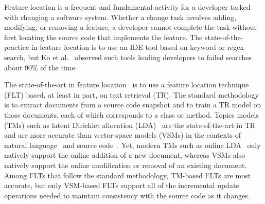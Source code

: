 
Feature location is a frequent and fundamental activity for a developer tasked with changing a software system.
Whether a change task involves adding, modifying, or removing a feature, a developer cannot complete the task without first locating the source code that implements the feature.
The state-of-the-practice in feature location is to use an IDE tool based on keyword or regex search, but Ko et al.~\cite{Ko-etal:2006} observed such tools leading developers to failed searches about 90\% of the time.

The state-of-the-art in feature location~\cite{Dit-etal:2011} is to use a feature location technique (FLT) based, at least in part, on text retrieval (TR).
The standard methodology~\cite{Marcus-etal:2004} is to extract documents from a source code snapshot and to train a TR model on those documents, each of which corresponds to a class or method.
Topics models (TMs) such as latent Dirichlet allocation (LDA)~\cite{Blei-etal:2003} are the state-of-the-art in TR~\cite{Blei:2012} and are more accurate than vector-space models (VSMs) in the contexts of natural language~\cite{Deerwester-etal:1990,Blei-etal:2003} and source code~\cite{Poshyvanyk-etal:2007,Lukins-etal:2010}.
Yet, modern TMs such as online LDA~\cite{Hoffman-etal:2010} only natively support the online addition of a new document, whereas VSMs also natively support the online modification or removal of an existing document.
Among FLTs that follow the standard methodology, TM-based FLTs are most accurate, but only VSM-based FLTs support all of the incremental update operations needed to maintain consistency with the source code as it changes.

